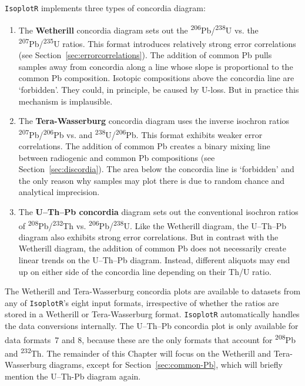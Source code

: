 \begin{refsection}
\texttt{IsoplotR} implements three types of concordia diagram:

\begin{enumerate}
\item The \textbf{Wetherill} concordia diagram sets out the
  \textsuperscript{206}Pb/\textsuperscript{238}U vs. the
  \textsuperscript{207}Pb/\textsuperscript{235}U ratios. This format
  introduces relatively strong error correlations (see
  Section~\ref{sec:errorcorrelations}). The addition of common Pb
  pulls samples away from concordia along a line whose slope is
  proportional to the common Pb composition. Isotopic compositions
  above the concordia line are `forbidden'. They could, in principle,
  be caused by U-loss. But in practice this mechanism is implausible.
\item The \textbf{Tera-Wasserburg} concordia diagram uses the inverse
  isochron ratios \textsuperscript{207}Pb/\textsuperscript{206}Pb vs.
  and \textsuperscript{238}U/\textsuperscript{206}Pb. This format
  exhibits weaker error correlations. The addition of common Pb
  creates a binary mixing line between radiogenic and common Pb
  compositions (see Section~\ref{sec:discordia}). The area below the
  concordia line is `forbidden' and the only reason why samples may
  plot there is due to random chance and analytical imprecision.
\item The \textbf{U--Th--Pb concordia} diagram sets out the
  conventional isochron ratios of
  \textsuperscript{208}Pb/\textsuperscript{232}Th vs.
  \textsuperscript{206}Pb/\textsuperscript{238}U. Like the Wetherill
  diagram, the U--Th--Pb diagram also exhibits strong error
  correlations.  But in contrast with the Wetherill diagram, the
  addition of common Pb does not necessarily create linear trends on
  the U--Th--Pb diagram. Instead, different aliquots may end up on
  either side of the concordia line depending on their Th/U ratio.
\end{enumerate}

The Wetherill and Tera-Wasserburg concordia plots are available to
datasets from any of \texttt{IsoplotR}'s eight input formats,
irrespective of whether the ratios are stored in a Wetherill or
Tera-Wasserburg format. \texttt{IsoplotR} automatically handles the
data conversions internally. The U--Th--Pb concordia plot is only
available for data formats~7 and 8, because these are the only formats
that account for \textsuperscript{208}Pb and \textsuperscript{232}Th.
The remainder of this Chapter will focus on the Wetherill and
Tera-Wasserburg diagrams, except for Section~\ref{sec:common-Pb},
which will briefly mention the U--Th-Pb diagram again.


\end{refsection}

